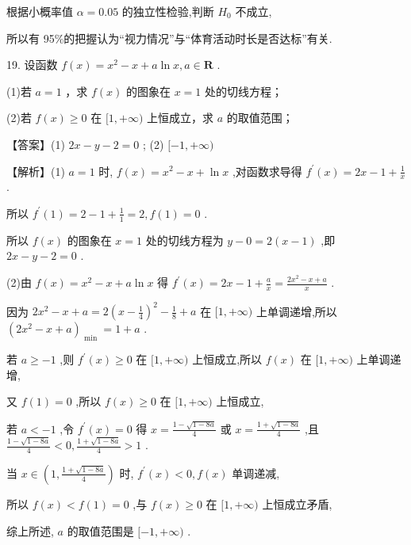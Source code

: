 \documentclass[10pt]{article}
\begin{document}
根据小概率值 \(\alpha  = {0.05}\) 的独立性检验,判断 \({H}_{0}\) 不成立,

所以有 95\%的把握认为“视力情况”与“体育活动时长是否达标”有关.

19. 设函数 \(f\left( x\right)  = {x}^{2} - x + a\ln x,a \in  \mathbf{R}\) .

(1)若 \(a = 1\) ，求 \(f\left( x\right)\) 的图象在 \(x = 1\) 处的切线方程；

(2)若 \(f\left( x\right)  \geq  0\) 在 \(\lbrack 1, + \infty )\) 上恒成立，求 \(a\) 的取值范围；

【答案】(1) \({2x} - y - 2 = 0\) ; (2) \(\lbrack  - 1, + \infty )\)

【解析】(1) \(a = 1\) 时, \(f\left( x\right)  = {x}^{2} - x + \ln x\) ,对函数求导得 \({f}^{\prime }\left( x\right)  = {2x} - 1 + \frac{1}{x}\) .

所以 \({f}^{\prime }\left( 1\right)  = 2 - 1 + \frac{1}{1} = 2,f\left( 1\right)  = 0\) .

所以 \(f\left( x\right)\) 的图象在 \(x = 1\) 处的切线方程为 \(y - 0 = 2\left( {x - 1}\right)\) ,即 \({2x} - y - 2 = 0\) .

(2)由 \(f\left( x\right)  = {x}^{2} - x + a\ln x\) 得 \({f}^{\prime }\left( x\right)  = {2x} - 1 + \frac{a}{x} = \frac{2{x}^{2} - x + a}{x}\) .

因为 \(2{x}^{2} - x + a = 2{\left( x - \frac{1}{4}\right) }^{2} - \frac{1}{8} + a\) 在 \(\lbrack 1, + \infty )\) 上单调递增,所以 \({\left( 2{x}^{2} - x + a\right) }_{\text{ min }} = 1 + a\) .

若 \(a \geq   - 1\) ,则 \({f}^{\prime }\left( x\right)  \geq  0\) 在 \(\lbrack 1, + \infty )\) 上恒成立,所以 \(f\left( x\right)\) 在 \(\lbrack 1, + \infty )\) 上单调递增,

又 \(f\left( 1\right)  = 0\) ,所以 \(f\left( x\right)  \geq  0\) 在 \(\lbrack 1, + \infty )\) 上恒成立,

若 \(a <  - 1\) ,令 \({f}^{\prime }\left( x\right)  = 0\) 得 \(x = \frac{1 - \sqrt{1 - {8a}}}{4}\) 或 \(x = \frac{1 + \sqrt{1 - {8a}}}{4}\) ,且 \(\frac{1 - \sqrt{1 - {8a}}}{4} < 0,\frac{1 + \sqrt{1 - {8a}}}{4} > 1\) .

当 \(x \in  \left( {1,\frac{1 + \sqrt{1 - {8a}}}{4}}\right)\) 时, \({f}^{\prime }\left( x\right)  < 0,f\left( x\right)\) 单调递减,

所以 \(f\left( x\right)  < f\left( 1\right)  = 0\) ,与 \(f\left( x\right)  \geq  0\) 在 \(\lbrack 1, + \infty )\) 上恒成立矛盾,

综上所述, \(a\) 的取值范围是 \(\lbrack  - 1, + \infty )\) .
\end{document}
